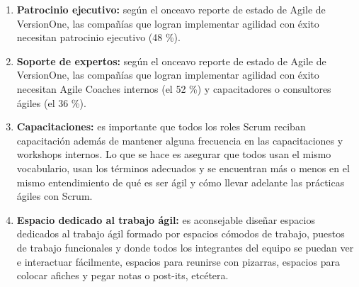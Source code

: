 \begin{enumerate}
\item \textbf{Patrocinio ejecutivo:} según el onceavo reporte de estado de Agile de VersionOne, las compañías que logran implementar agilidad con éxito necesitan patrocinio ejecutivo (48 \%).

\item \textbf{Soporte de expertos:} según el onceavo reporte de estado de Agile de VersionOne, las compañías que logran implementar agilidad con éxito necesitan Agile Coaches internos (el 52 \%) y capacitadores o consultores ágiles (el 36 \%).

\item \textbf{Capacitaciones:} es importante que todos los roles Scrum reciban capacitación además de mantener alguna frecuencia en las capacitaciones y workshops internos. Lo que se hace es asegurar que todos usan el mismo vocabulario, usan los términos adecuados y se encuentran más o menos en el mismo entendimiento de qué es ser ágil y cómo llevar adelante las prácticas ágiles con Scrum.

\item \textbf{Espacio dedicado al trabajo ágil:} es aconsejable diseñar espacios dedicados al trabajo ágil formado por espacios cómodos de trabajo, puestos de trabajo funcionales y donde todos los integrantes del equipo se puedan ver e interactuar fácilmente, espacios para reunirse con pizarras, espacios para colocar afiches y pegar notas o post-its, etcétera. 
\end{enumerate}

